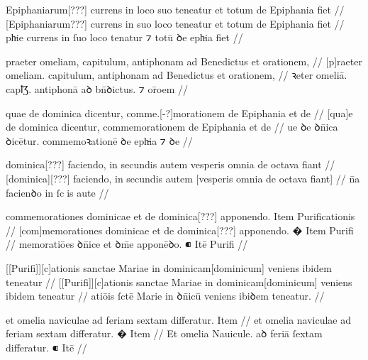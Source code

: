 \ex \bg
\gla
{}
 Epiphaniarum[???] currens in {} loco suo
teneatur et totum de Epiphania fiet
//
\glRekonstrukcja
{}
 [Epiphaniarum???] currens in suo loco {}
teneatur et totum de Epiphania fiet
//
\glU
{}
ph̵ie currens in ſuo loco {} tenatur ⁊ totū ꝺe eph̵ia fiet
//
\endgl
\xe



\ex \bg
\gla
{}
praeter omeliam, capitulum, antiphonam ad Benedictus et orationem,
//
\glRekonstrukcja
{}
[p]raeter omeliam. capitulum, antiphonam ad Benedictus et orationem,
//
\glU
{}
ꝛeter omeliā. capꝉƷ. antiphonā aꝺ bn̄ꝺictus. ⁊ or̄oem
//
\endgl
\xe



\ex \bg
\gla
{}
quae de dominica dicentur, comme.[-?]morationem de Epiphania et de
//
\glRekonstrukcja
{}
[qua]e de dominica dicentur, commemorationem de Epiphania et de
//
\glU
{}
ue ꝺe ꝺn̄ica ꝺicētur. commemoꝛationē ꝺe eph̵ia ⁊ ꝺe
//
\endgl
\xe




\ex \bg
\gla
{}
dominica[???] faciendo, in secundis autem
vesperis omnia de octava fiant 
//
\glRekonstrukcja
{}
[dominica][???] faciendo, in secundis autem
[vesperis omnia de octava fiant]
//
\glU
{}
n̄a facienꝺo in ſcis aute     
//
\endgl
\xe



\ex \bg
\gla
{}
commemorationes dominicae et de dominica[???] apponendo.
{} Item Purificationis
//
\glRekonstrukcja
{}
[com]memorationes dominicae et de dominica[???] apponendo.
� Item Purifi
//
\glU
{}
memoratiōes ꝺn̄ice et {} ꝺm̄e apponēꝺo. ⁌ Itē Purifi
//
\endgl
\xe



\ex \bg
\gla
{}
[[Purifi]][c]ationis sanctae Mariae in dominicam[dominicum] veniens ibidem
teneatur
//
\glRekonstrukcja
{}
[[Purifi]][c]ationis sanctae Mariae in dominicam[dominicum] veniens ibidem
teneatur
//
\glU
{}
atiōis ſctē Marie in ꝺn̄icū veniens ibiꝺem teneatur.
//
\endgl
\xe



\ex \bg
\gla
{}
et omelia naviculae ad feriam sextam differatur.
{} Item
//
\glRekonstrukcja
{}
et omelia naviculae ad feriam sextam differatur.
{�} Item
//
\glU
{}
Et omelia Nauicule. aꝺ feriā ſextam diﬀeratur. ⁌ Itē
//
\endgl
\xe



